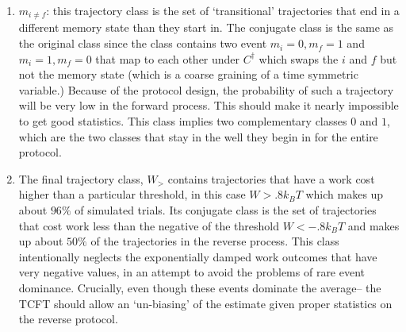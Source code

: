 \documentclass[paper=a4, fontsize=10pt]{article} %
\numberwithin{equation}{section} %
\numberwithin{figure}{section} %
\numberwithin{table}{section} %
\def\kB {k_B}
\begin{document}
\begin{enumerate}
\item $m_{i \neq f}$: this trajectory class is the set of `transitional' trajectories that end in a different memory state than they start in. The conjugate class is the same as the original class since the class contains two event $m_i=0, m_f=1$ and $m_i=1, m_f=0$ that map to each other under $C^{\dagger}$ which swaps the $i$ and $f$ but not the memory state (which is a coarse graining of a time symmetric variable.) Because of the protocol design, the probability of such a trajectory will be very low in the forward process. This should make it nearly impossible to get good statistics. This class implies two complementary classes $0$ and $1$, which are the two classes that stay in the well they begin in for the entire protocol.
\item The final trajectory class, $W_{>}$ contains trajectories that have a work cost higher than a particular threshold, in this case $W > .8 \kB T$ which makes up about $96\%$ of simulated trials. Its conjugate class is the set of trajectories that cost work less than the negative of the threshold $W< -.8 \kB T$ and makes up about $50\%$ of the trajectories in the reverse process. This class intentionally neglects the exponentially damped work outcomes that have very negative values, in an attempt to avoid the problems of rare event dominance. Crucially, even though these events dominate the average-- the TCFT should allow an `un-biasing' of the estimate given proper statistics on the reverse protocol.
\end{enumerate}
\end{document}
